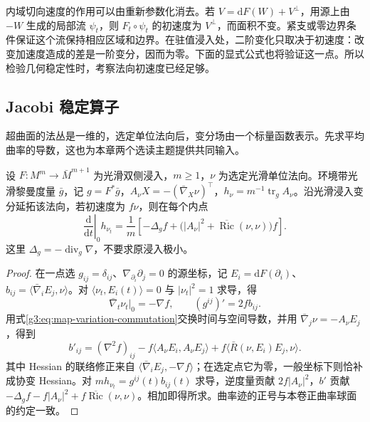 内域切向速度的作用可以由重新参数化消去。若 \(V=\mathrm dF(W)+V^\perp\)，用源上由 \(-W\) 生成的局部流 \(\psi_t\)，则 \(F_t\circ\psi_t\) 的初速度为 \(V^\perp\)，而面积不变。紧支或零边界条件保证这个流保持相应区域和边界。在驻值浸入处，二阶变化只取决于初速度：改变加速度造成的差是一阶变分，因而为零。下面的显式公式也将验证这一点。所以检验几何稳定性时，考察法向初速度已经足够。

\subsection{Jacobi 稳定算子}
\label{g3:subsec:1901:03}
超曲面的法丛是一维的，选定单位法向后，变分场由一个标量函数表示。先求平均曲率的导数，这也为本章两个选读主题提供共同输入。

\begin{proposition}\label{g3:prop:hypersurface-mean-variation}
	设 \(F:M^m\to\bar M^{m+1}\) 为光滑双侧浸入，\(m\ge1\)，\(\nu\) 为选定光滑单位法向。环境带光滑黎曼度量 \(\bar g\)，记 \(g=F^*\bar g\)，\(A_\nu X=-(\bar\nabla_X\nu)^\top\)，\(h_\nu=m^{-1}\operatorname{tr}_gA_\nu\)。沿光滑浸入变分延拓该法向，若初速度为 \(f\nu\)，则在每个内点
	\begin{equation}\label{g3:eq:hypersurface-mean-variation}
		\left.\frac{\mathrm d}{\mathrm dt}\right|_0 h_{\nu_t}
		=\frac1m\left[-\Delta_g f+
		\bigl(|A_\nu|^2+\overline{\operatorname{Ric}}(\nu,\nu)\bigr)f\right].
	\end{equation}
	这里 \(\Delta_g=-\operatorname{div}_g\nabla\)，不要求原浸入极小。
\end{proposition}
\begin{proof}
	在一点选 \(g_{ij}=\delta_{ij}\)、\(\nabla_{\partial_i}\partial_j=0\) 的源坐标，记 \(E_i=\mathrm dF(\partial_i)\)、\(b_{ij}=\langle\bar\nabla_iE_j,\nu\rangle\)。对 \(\langle\nu_t,E_i(t)\rangle=0\) 与 \(|\nu_t|^2=1\) 求导，得
	\[
		\bar\nabla_t\nu_t|_0=-\nabla f,
		\qquad (g^{ij})'=2f b_{ij}.
	\]
	用式\eqref{g3:eq:map-variation-commutation}交换时间与空间导数，并用 \(\bar\nabla_j\nu=-A_\nu E_j\)，得到
	\[
		b'_{ij}=(\nabla^2 f)_{ij}
		-f\langle A_\nu E_i,A_\nu E_j\rangle
		+f\langle\bar R(\nu,E_i)E_j,\nu\rangle.
	\]
	其中 Hessian 的联络修正来自 \(\langle\bar\nabla_iE_j,-\nabla f\rangle\)；在选定点它为零，一般坐标下则恰补成协变 Hessian。对 \(m h_{\nu_t}=g^{ij}(t)b_{ij}(t)\) 求导，逆度量贡献 \(2f|A_\nu|^2\)，\(b'\) 贡献
	\(-\Delta_g f-f|A_\nu|^2+f\overline{\operatorname{Ric}}(\nu,\nu)\)。相加即得所求。曲率迹的正号与本卷正曲率球面的约定一致。
\end{proof}

